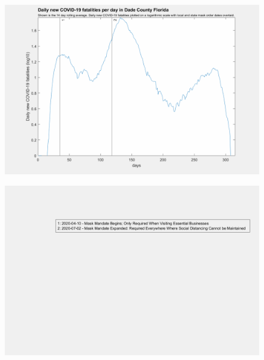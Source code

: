 \documentclass[]{article}
\begin{document}
\begin{figure}[!h]
	\includegraphics[width=\linewidth]{images/dade_mask_order_fatalities_log.png}
	\caption{}
	\label{fig:images/dade_mask_order_fatalities_logLabel}
\end{figure}

\begin{figure}[!h]
	\includegraphics[width=\linewidth]{legends/broward_mask_order_legend.png}
	\caption{}
	\label{fig:legends/broward_mask_order_legendLabel}
\end{figure}
\end{document}
